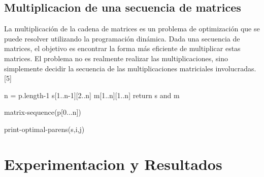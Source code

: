 \documentclass[spanish]{article}
\begin{document}
	\subsection{Multiplicacion de una secuencia de matrices}			
	La multiplicación de la cadena de matrices es un problema de optimización que se puede resolver utilizando la programación dinámica. Dada una secuencia de matrices, el objetivo es encontrar la forma más eficiente de multiplicar estas matrices. El problema no es realmente realizar las multiplicaciones, sino simplemente decidir la secuencia de las multiplicaciones matriciales involucradas.[5]\\
	\begin{algorithm}[H]
		n = p.length-1\;		
		s[1..n-1][2..n]\;	
		m[1..n][1..n]\;		
		return s and m\;
		\caption{matrix-sequence(p[0...n])}
	\end{algorithm}
	\begin{algorithm}[H]
		\caption{print-optimal-parens(s,i,j)}
	\end{algorithm}
	\section{Experimentacion y Resultados}
\end{document}
